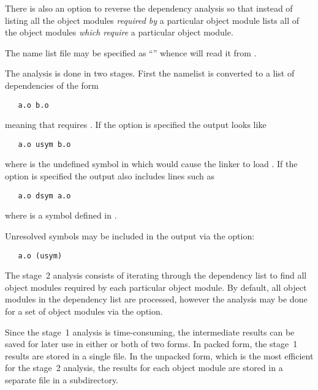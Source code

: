 There is also an option to reverse the dependency analysis so that instead of
listing all the object modules {\em required by} a particular object module
 lists all of the object modules {\em which require} a particular
object module.

The name list file may be specified as ``\file{-}'' whence  will
read it from .

The analysis is done in two stages.  First the namelist is converted to a list
of dependencies of the form

\begin{verbatim}
   a.o b.o
\end{verbatim}

\noindent
meaning that  requires .  If the  option is
specified the output looks like

\begin{verbatim}
   a.o usym b.o
\end{verbatim}

\noindent
where  is the undefined symbol in  which would cause the
linker to load .  If the  option is specified the output
also includes lines such as

\begin{verbatim}
   a.o dsym a.o
\end{verbatim}

\noindent
where  is a symbol defined in .

Unresolved symbols may be included in the output via the  option:

\begin{verbatim}
   a.o (usym)
\end{verbatim}

\noindent
The stage~2 analysis consists of iterating through the dependency list to find
all object modules required by each particular object module.  By default, all
object modules in the dependency list are processed, however the analysis may
be done for a set of object modules via the  option.

Since the stage~1 analysis is time-consuming, the intermediate results can be
saved for later use in either or both of two forms.  In packed form, the
stage~1 results are stored in a single file.  In the unpacked form, which is
the most efficient for the stage~2 analysis, the results for each object
module are stored in a separate file in a subdirectory.

